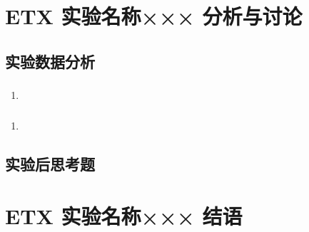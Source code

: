 \documentclass[dvipsnames, svgnames,a4paper,11pt]{article}
\begin{document}
	\section{ETX 实验名称××× \quad\heiti 分析与讨论}
	
	\subsection{实验数据分析}
	
	\subsubsection{}
	\begin{enumerate}
		\item 
	\end{enumerate}
	
	\subsubsection{}
	\begin{enumerate}
		\item 
	\end{enumerate}
	
	\subsubsection{}
	
	
	\subsection{实验后思考题}
	
	\begin{question}
		
	\end{question}
	
	\begin{question}
		
	\end{question}
	
	\begin{question}
		
	\end{question}
	
	
	
	\clearpage
	
	\section{ETX 实验名称××× \quad\heiti 结语}
	
\end{document}
